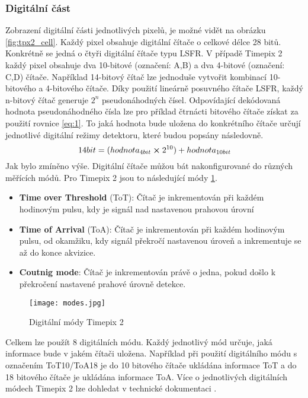 \subsubsection{Digitální část}
\label{Digitálni cast}
Zobrazení digitální části jednotlivých pixelů, je možné vidět na obrázku \ref{fig:tpx2_cell}. Každý pixel obsahuje digitální čítače o celkové délce 28 bitů. Konkrétně se jedná o čtyři digitální čítače typu LSFR. V případě Timepix 2 každý pixel obsahuje dva 10-bitové (označení: A,B) a dva 4-bitové (označení: C,D) čítače. Například 14-bitový čítač lze jednoduše vytvořit kombinací 10-bitového a 4-bitového čítače. Díky použití lineárně posuvného čítače LSFR, každý n-bitový čítač generuje $2^n$ pseudonáhodných čísel. Odpovídající dekódovaná hodnota pseudonáhodného čísla lze pro příklad čtrnácti bitového čítače získat za použití rovnice \ref{eq:1}. To jaká hodnota bude uložena do konkrétního čítače určují jednotlivé digitální režimy detektoru, které budou popsány následovně.
\begin{equation}
	14bit = (hodnota_{4bit} \cross 2^{10}) + hodnota_{10bit}
	\label{eq:1}
\end{equation}
Jak bylo zmíněno výše. Digitální čítače můžou bát nakonfigurované do různých měřících módů. Pro Timepix 2 jsou to následující módy \ref{fig:modes}. 
\begin{itemize}
	\item \textbf{Time over Threshold} (ToT): Čítač je inkrementován při každém hodinovým pulsu, kdy je signál nad nastavenou prahovou úrovní
	\item \textbf{Time of Arrival} (ToA): Čítač je inkrementován při každém hodinovým pulsu, od okamžiku, kdy signál překročí nastavenou úroveň a inkrementuje se až do konce akvizice.
	\item \textbf{Coutnig mode}: Čítač je inkrementován právě o jedna, pokud došlo k překročení nastavené prahové úrovně detekce.
\end{itemize}
\begin{figure}[h!]
	\centering
	\captionsetup{justification=centering}
	\texttt{[image: modes.jpg]}
	\caption{Digitální módy Timepix 2 \cite{Manek}} 
	\label{fig:modes}
\end{figure}	
\par Celkem lze použít 8 digitálních módu. Každý jednotlivý mód určuje, jaká informace bude v jakém čítači uložena. Například při použití digitálního módu s označením ToT10/ToA18  je do 10 bitového čítače ukládána informace ToT a do 18 bitového čítače je ukládána informace ToA. Více o jednotlivých digitálních módech Timepix 2 lze dohledat v technické dokumentaci \cite{tpx2_manual}.

